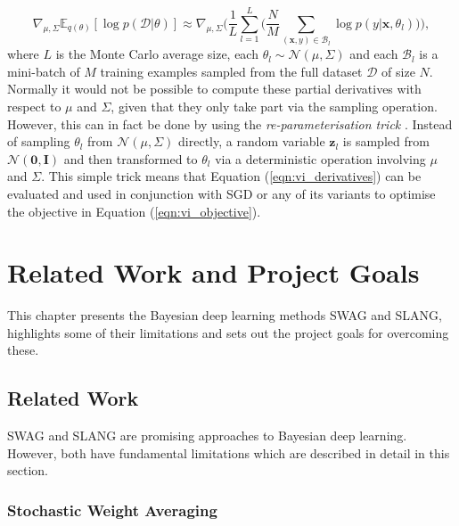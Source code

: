 \documentclass[msc,deptreport.inf]{infthesis} %
\newcommand{\matr}[1]{\mathbf{#1}}
\newcommand{\E}{\mathbb E}
\begin{document}
\begin{equation}\label{eqn:vi_derivatives}
	 \nabla_{\mu, \Sigma} \E_{q(\theta)} [\log p(\mathcal{D} | \theta)]
	\approx \nabla_{\mu, \Sigma} \Bigg(\frac{1}{L}  \sum_{l=1}^{L} \Bigg( \frac{N}{M} \sum_{(\matr{x}, y) \in \mathcal{B}_l} \log p(y | \matr{x}, \theta_l) \Bigg)\Bigg),
\end{equation}
where $L$ is the Monte Carlo average size, each $\theta_l \sim \mathcal{N}(\mu, \Sigma)$ and each $\mathcal{B}_l$ is a mini-batch of $M$ training examples sampled from the full dataset $\mathcal{D}$ of size $N$. Normally it would not be possible to compute these partial derivatives with respect to $\mu$ and $\Sigma$, given that they only take part via the sampling operation. However, this can in fact be done by using the \emph{re-parameterisation trick} \cite{goodfellow2016}. Instead of sampling $\theta_l$ from $\mathcal{N}(\mu, \Sigma)$ directly, a random variable $\matr{z}_l$ is sampled from $\mathcal{N}(\matr{0}, \matr{I})$ and then transformed to $\theta_l$ via a deterministic operation involving $\mu$ and $\Sigma$. This simple trick means that Equation (\ref{eqn:vi_derivatives}) can be evaluated and used in conjunction with SGD or any of its variants to optimise the objective in Equation (\ref{eqn:vi_objective}).


\chapter{Related Work and Project Goals}\label{ch:previous_work}

This chapter presents the Bayesian deep learning methods SWAG and SLANG, highlights some of their limitations and sets out the project goals for overcoming these. 

\section{Related Work}\label{sec:related_work}

SWAG and SLANG are promising approaches to Bayesian deep learning. However, both have fundamental limitations which are described in detail in this section.

\subsection{Stochastic Weight Averaging}\label{sec:swa}
\end{document}
